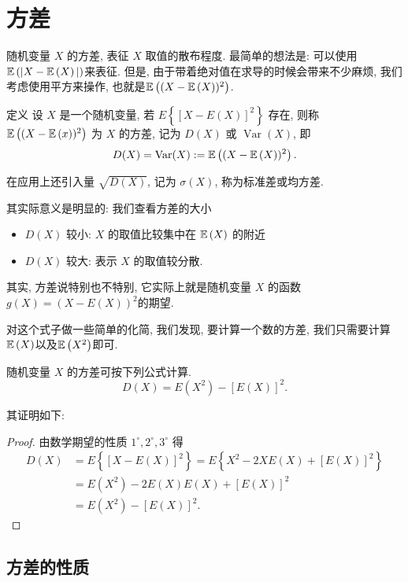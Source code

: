 \section{方差}
随机变量 $X$ 的方差, 表征 $X$ 取值的散布程度. 最简单的想法是: 可以使用$\mathbb E\left(|X-\mathbb E\left(X\right)|\right)$来表征. 但是, 由于带着绝对值在求导的时候会带来不少麻烦, 我们考虑使用平方来操作, 也就是$\mathbb E\left((X-\mathbb E\left(X\right))^2\right)$. 

\begin{definition}
    定义 设 $X$ 是一个随机变量, 若 $E\left\{[X-E(X)]^2\right\}$ 存在, 则称 $\mathbb E\left((X-\mathbb E\left(x\right))^2\right)$ 为 $X$ 的方差, 记为 $D(X)$ 或 $\operatorname{Var}(X)$, 即
$$
D(X)=\operatorname{Var}(X):=\mathbb E\left((X-\mathbb E\left(X\right))^2\right).
$$
\end{definition}

在应用上还引入量 $\sqrt{D(X)}$, 记为 $\sigma(X)$, 称为标准差或均方差.

其实际意义是明显的: 我们查看方差的大小
\begin{itemize}
    \item $D(X)$ 较小:  $X$ 的取值比较集中在 $\mathbb E\left(X\right) $ 的附近
    \item $D(X)$ 较大: 表示 $X$ 的取值较分散.
\end{itemize}

其实, 方差说特别也不特别, 它实际上就是随机变量 $X$ 的函数 $g(X)=(X-E(X))^2$的期望. 

对这个式子做一些简单的化简, 我们发现, 要计算一个数的方差, 我们只需要计算$\mathbb E\left(X\right)$以及$\mathbb E\left(X^2\right)$即可. 

   \begin{proposition}
       随机变量 $X$ 的方差可按下列公式计算.
   $$
   D(X)=E\left(X^2\right)-[E(X)]^2 .
   $$
   \end{proposition}
   
   其证明如下: 
   \begin{proof}
       由数学期望的性质 $1^{\circ}, 2^{\circ}, 3^{\circ}$ 得
   $$
   \begin{aligned}
   D(X) & =E\left\{[X-E(X)]^2\right\}=E\left\{X^2-2 X E(X)+[E(X)]^2\right\} \\
   & =E\left(X^2\right)-2 E(X) E(X)+[E(X)]^2 \\
   & =E\left(X^2\right)-[E(X)]^2 .
   \end{aligned}
   $$
      \end{proof}




   \subsection{方差的性质}

